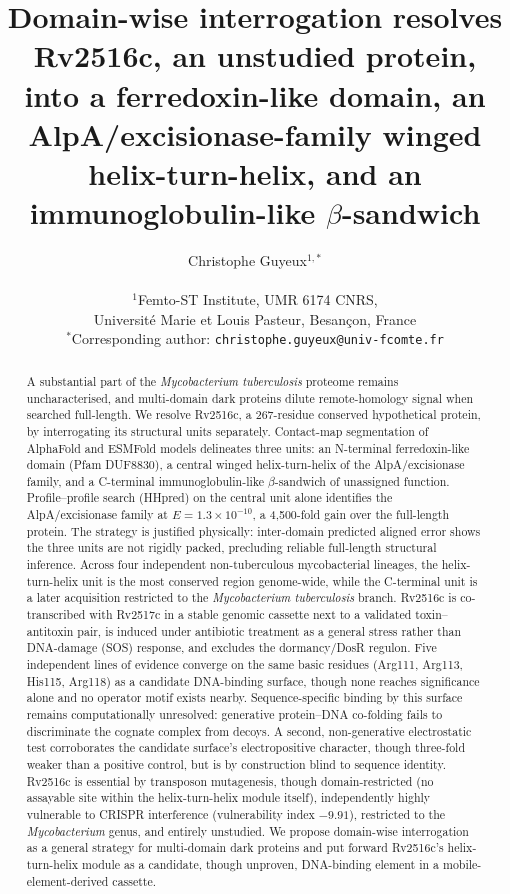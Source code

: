 \documentclass[11pt,a4paper]{article}
\title{Domain-wise interrogation resolves Rv2516c, an unstudied \mtb{} protein,
  into a ferredoxin-like domain, an AlpA/excisionase-family winged helix-turn-helix,
  and an immunoglobulin-like $\beta$-sandwich}
\author{Christophe Guyeux$^{1,*}$\\[6pt]
  \parbox{\textwidth}{\centering\small
    $^{1}$Femto-ST Institute, UMR 6174 CNRS,\\
    Universit\'e Marie et Louis Pasteur, Besan\c{c}on, France\\[3pt]
    $^{*}$Corresponding author: \texttt{christophe.guyeux@univ-fcomte.fr}
  }
}
\date{}
\newcommand{\mtb}{\textit{Mycobacterium tuberculosis}}
\begin{document}
\linenumbers
\maketitle

\begin{abstract}
\noindent
A substantial part of the \mtb{} proteome remains uncharacterised, and multi-domain
dark proteins dilute remote-homology signal when searched full-length. We resolve Rv2516c, a
267-residue conserved hypothetical protein, by
interrogating its structural units separately. Contact-map segmentation of AlphaFold and ESMFold
models delineates three units: an N-terminal ferredoxin-like domain (Pfam DUF8830), a central
winged helix-turn-helix of the AlpA/excisionase family, and a C-terminal immunoglobulin-like
$\beta$-sandwich of unassigned function. Profile--profile search (HHpred) on the central unit
alone identifies the AlpA/excisionase family at $E=1.3\times10^{-10}$, a 4{,}500-fold gain over
the full-length protein. The strategy is justified physically: inter-domain predicted aligned
error shows the three units are not rigidly packed, precluding reliable full-length structural
inference. Across four independent non-tuberculous mycobacterial lineages, the helix-turn-helix
unit is the most conserved region genome-wide, while the C-terminal unit is a later acquisition
restricted to the \mtb{} branch. Rv2516c is co-transcribed with Rv2517c in a stable genomic
cassette next to a validated toxin--antitoxin pair, is induced under antibiotic treatment as a
general stress rather than DNA-damage (SOS) response, and excludes the dormancy/DosR regulon. Five
independent lines of evidence converge on the same basic residues (Arg111, Arg113, His115, Arg118)
as a candidate DNA-binding surface, though none reaches significance alone and no operator motif
exists nearby. Sequence-specific binding by this surface remains computationally unresolved:
generative protein--DNA co-folding fails to discriminate the cognate complex from decoys. A
second, non-generative electrostatic test corroborates the candidate surface's electropositive
character, though three-fold weaker than a positive control, but is by construction blind to
sequence identity. Rv2516c is essential by transposon mutagenesis, though
domain-restricted (no assayable site within the helix-turn-helix module itself), independently
highly vulnerable to CRISPR interference (vulnerability index $-9.91$), restricted to the
\textit{Mycobacterium} genus, and entirely unstudied. We propose
domain-wise interrogation as a general strategy for multi-domain dark proteins and put forward
Rv2516c's helix-turn-helix module as a candidate, though unproven, DNA-binding element in a
mobile-element-derived cassette.
\end{abstract}
\end{document}
